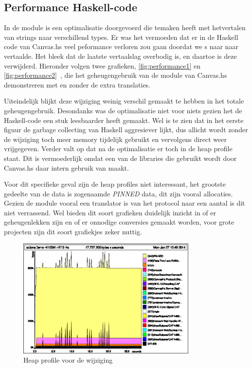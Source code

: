 \subsection{Performance Haskell-code}

In de module is een optimalisatie doorgevoerd die temaken heeft met hetvertalen van strings naar verschillend types. Er was het vermoeden dat er in de Haskell code van Canvas.hs veel peformance verloren zou gaan doordat we s naar  naar  vertaalde. Het bleek dat de laatste vertaalslag overbodig is, en daartoe is deze verwijderd. Hieronder volgen twee grafieken, \autoref{fig:performance1} en \autoref{fig:performance2}~, die het geheugengebruik van de module van Canvas.hs demonstreren met en zonder de extra translaties.

Uiteindelijk blijkt deze wijziging weinig verschil gemaakt te hebben in het totale geheugengebruik. Desondanks was de optimalisatie niet voor niets gezien het de Haskell-code een stuk leesbaarder heeft gemaakt. Wel is te zien dat in het eerste figuur de garbage collecting van Haskell aggresiever lijkt, dus allicht wordt zonder de wijziging toch meer memory tijdelijk gebruikt en vervolgens direct weer vrijgegeven. Verder valt op dat na de optimalisatie er toch  in de heap profile staat. Dit is vermoederlijk omdat een van de libraries die gebruikt wordt door Canvas.hs daar intern gebruik van maakt.

Voor dit specifieke geval zijn de heap profiles niet interessant, het grootste gedeelte van de data is zogenaamde \emph{PINNED} data, dit zijn vooral  allocaties. Gezien de module vooral een translator is van het protocol naar een aantal  is dit niet verrassend. Wel bieden dit soort grafieken duidelijk inzicht in of er geheugenlekken zijn en of er onnodige conversies gemaakt worden, voor grote projecten zijn dit soort grafiekjes zeker nuttig.

\begin{figure}[H]
\begin{center}
\includegraphics[keepaspectratio,width=0.8\textwidth]{./images/actionsDemoBeforeByteStrings.eps}
\caption{Heap profile voor de wijziging}
\label{fig:performance1}
\end{center}
\end{figure}

